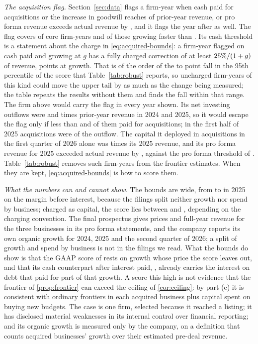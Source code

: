 \noindent\emph{The acquisition flag.} Section~\ref{sec:data} flags a firm-year when cash paid for acquisitions or the increase in goodwill reaches \acqFlagCash{} of prior-year revenue, or pro forma revenue exceeds actual revenue by \acqFlagPf, and it flags the year after as well. The flag covers \acqFlagCov{} of core firm-years and \acqFlagCovFast{} of those growing faster than \acqFlagG. Its cash threshold is a statement about the charge in \eqref{eq:acquired-bounds}: a firm-year flagged on cash paid and growing at $g$ has a fully charged correction of at least $25\%/(1+g)$ of revenue, \acqFlagCorr{} points at \acqFlagG{} growth. That is of the order of the \acqPninetyfiveLo{} to \acqPninetyfiveHi{} point fall in the 95th percentile of the score that Table~\ref{tab:robust} reports, so uncharged firm-years of this kind could move the upper tail by as much as the change being measured; the table repeats the results without them and finds the fall within that range. The firm above would carry the flag in every year shown. Its net investing outflows were \acqOutPrevTwentyFour{} and \acqOutPrevTwentyFive{} times prior-year revenue in 2024 and 2025, so it would escape the flag only if less than \acqNeedTwentyFour{} and \acqNeedTwentyFive{} of them paid for acquisitions; in the first half of 2025 acquisitions were \acqAcqShareHOneFive{} of the outflow. The capital it deployed in acquisitions in the first quarter of 2026 alone was \acqDepPrevQOne{} times its 2025 revenue, and its pro forma revenue for 2025 exceeded actual revenue by \acqPfExcess, against the pro forma threshold of \acqFlagPf. Table~\ref{tab:robust} removes such firm-years from the frontier estimates. When they are kept, \eqref{eq:acquired-bounds} is how to score them.

\noindent\emph{What the numbers can and cannot show.} The bounds are wide, from \acqRAllInvUTwentyFive{} to \acqROcfUTwentyFive{} in 2025 on the margin before interest, because the filings split neither growth nor spend by business; charged as capital, the score lies between \acqConvLo{} and \acqConvHi, depending on the charging convention. The final prospectus gives prices and full-year revenue for the three businesses in its pro forma statements, and the company reports its own organic growth for 2024, 2025 and the second quarter of 2026; a split of growth and spend by business is not in the filings we read. What the bounds do show is that the GAAP score of \acqRGaapTwentyFive{} rests on growth whose price the score leaves out, and that its cash counterpart after interest paid, \acqROcfTwentyFive, already carries the interest on debt that paid for part of that growth. A score this high is not evidence that the frontier of \autoref{prop:frontier} can exceed the ceiling of \autoref{cor:ceiling}: by part (e) it is consistent with ordinary frontiers in each acquired business plus capital spent on buying new budgets. The case is one firm, selected because it reached a listing; it has disclosed material weaknesses in its internal control over financial reporting; and its organic growth is measured only by the company, on a definition that counts acquired businesses' growth over their estimated pre-deal revenue.
